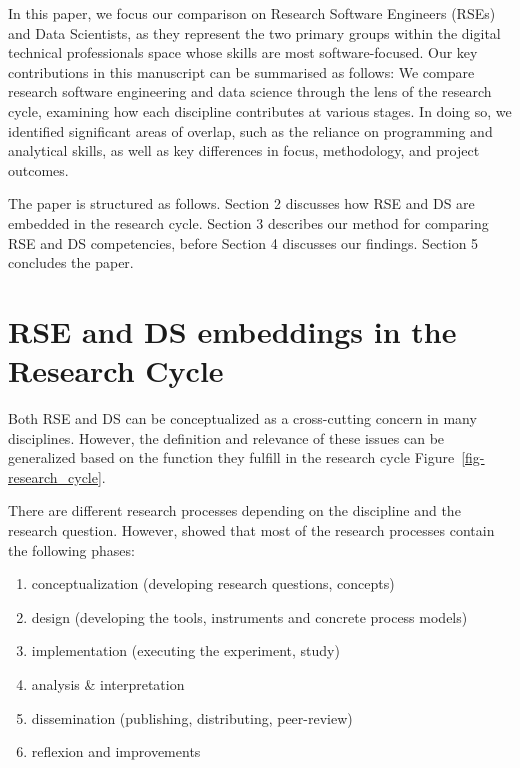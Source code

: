 \documentclass[
        english,biblatex
    ]{lni}
\providecommand{\tightlist}{%
    \setlength{\itemsep}{0pt}\setlength{\parskip}{0pt}}
\begin{document}
    In this paper, we focus our comparison on Research Software
    Engineers (RSEs) and Data Scientists, as they represent the two
    primary groups within the digital technical professionals space
    whose skills are most software-focused. Our key contributions in
    this manuscript can be summarised as follows: We compare research
    software engineering and data science through the lens of the
    research cycle, examining how each discipline contributes at various
    stages. In doing so, we identified significant areas of overlap,
    such as the reliance on programming and analytical skills, as well
    as key differences in focus, methodology, and project outcomes.

    The paper is structured as follows. Section 2 discusses how RSE and
    DS are embedded in the research cycle. Section 3 describes our
    method for comparing RSE and DS competencies, before Section 4
    discusses our findings. Section 5 concludes the paper.

    \section{RSE and DS embeddings in the Research
    Cycle}\label{rse-and-ds-embeddings-in-the-research-cycle}

    Both RSE and DS can be conceptualized as a cross-cutting concern in
    many disciplines. However, the definition and relevance of these
    issues can be generalized based on the function they fulfill in the
    research cycle Figure~\ref{fig-research_cycle}.

    There are different research processes depending on the discipline
    and the research question. However, \autocite{Dehne2021} showed that
    most of the research processes contain the following phases:

    \begin{enumerate}
    \def\labelenumi{\arabic{enumi}.}
    \tightlist
    \item
      conceptualization (developing research questions, concepts)
    \item
      design (developing the tools, instruments and concrete process
      models)
    \item
      implementation (executing the experiment, study)
    \item
      analysis \& interpretation
    \item
      dissemination (publishing, distributing, peer-review)
    \item
      reflexion and improvements
    \end{enumerate}
\end{document}
